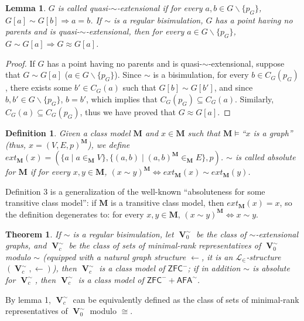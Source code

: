 \documentclass{amsart}
\newcommand{\zfc}{\mathsf{ZFC}}
\newcommand{\afa}{\mathsf{AFA}}
\DeclareMathOperator{\uni}{\mathbf{V}}
\newtheorem{theorem}{Theorem}
\newtheorem{lemma}{Lemma}
\newtheorem{definition}{Definition}
\begin{document}
\begin{lemma}
    $G$ is called quasi-$\sim$-extensional if for every $a,b\in G\backslash\{p_G\}$, $G[a]\sim G[b]\Rightarrow a=b$.
    If $\sim$ is a regular bisimulation, $G$ has a point having no parents and is quasi-$\sim$-extensional, then for every $a\in G\backslash \{p_G\}$, $G\sim G[a]\Rightarrow G\approx G[a]$.
\end{lemma}
\begin{proof}
    If $G$ has a point having no parents and is quasi-$\sim$-extensional, suppose that $G\sim G[a]$ ($a\in G\backslash \{p_G\}$).
    Since $\sim$ is a bisimulation, for every $b\in C_G(p_G)$, there exists some $b'\in C_G(a)$ such that $G[b]\sim G[b']$, and since $b,b'\in G\backslash \{p_G\}$, $b=b'$, which implies that $C_G(p_G)\subseteq C_G(a)$.
    Similarly, $C_G(a)\subseteq C_G(p_G)$, thus we have proved that $G\approx G[a]$.
\end{proof}

\begin{definition}
    Given a class model $\mathbf{M}$ and $x\in\mathbf{M}$ such that $\mathbf{M}\vDash$``$x$ is a graph'' (thus, $x=(V,E,p)^\mathbf{M}$), we define $ext_\mathbf{M}(x)=(\{a\mid a\in_\mathbf{M}V\},\{(a,b)\mid (a,b)^{\mathbf{M}}\in_{\mathbf{M}}E\},p)$.
    $\sim$ is called absolute for $\mathbf{M}$ if for every $x,y\in \mathbf{M}$, $(x\sim y)^\mathbf{M}\Leftrightarrow ext_\mathbf{M}(x)\sim ext_\mathbf{M}(y)$.
\end{definition}

Definition 3 is a generalization of the well-known ``absoluteness for some transitive class model'': if $\mathbf{M}$ is a transitive class model, then $ext_\mathbf{M}(x)=x$, so the definition degenerates to: for every $x,y\in \mathbf{M}$, $(x\sim y)^\mathbf{M}\Leftrightarrow x\sim y$.

\begin{theorem}\cite{Aczel}
    If $\sim$ is a regular bisimulation, let $\uni_0^\sim$ be the class of $\sim$-extensional graphs, and $\uni_c^\sim$ be the class of sets of minimal-rank representatives of $\uni_0^\sim$ modulo $\sim$ (equipped with a natural graph structure $\leftarrow$, it is an $\mathcal{L}_\in$-structure $(\uni_c^\sim,\leftarrow)$), then $\uni_c^\sim$ is a class model of $\zfc^-$; if in addition $\sim$ is absolute for $\uni_c^\sim$, then $\uni_c^\sim$ is a class model of $\zfc^-+\afa^\sim$.
\end{theorem}

By lemma 1, $\uni_c^\sim$ can be equivalently defined as the class of sets of minimal-rank representatives of $\uni_0^\sim$ modulo $\cong$.
\end{document}
